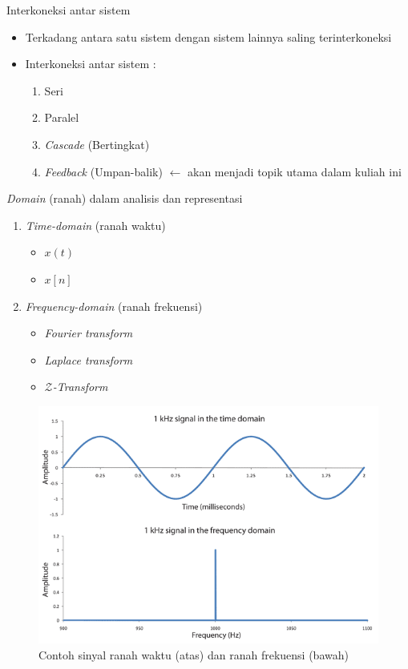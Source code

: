 \documentclass[aspectratio=169]{beamer}
\begin{document}
\begin{frame}{Interkoneksi antar sistem}
	\begin{itemize}
		\item Terkadang antara satu sistem dengan sistem lainnya saling terinterkoneksi
		\item Interkoneksi antar sistem :
		\begin{enumerate}
			\item Seri
			\item Paralel
			\item \textit{Cascade} (Bertingkat)
			\item \textit{Feedback} (Umpan-balik) $ \leftarrow $ akan menjadi topik utama dalam kuliah ini
		\end{enumerate}
	\end{itemize}
\end{frame}

\begin{frame}{\textit{Domain} (ranah) dalam analisis dan representasi}
	\begin{multicols}{2}
		\vfil\null
		\begin{enumerate}
			\item \textit{Time-domain} (ranah waktu)
			\begin{itemize}
				\item $ x(t) $
				\item $ x[n] $
			\end{itemize}
			\item \textit{Frequency-domain} (ranah frekuensi)
			\begin{itemize}
				\item \textit{Fourier transform}
				\item \textit{Laplace transform}
				\item \textit{$ \mathcal{Z} $-Transform}
			\end{itemize}
		\end{enumerate}
		\vfil\null
		\columnbreak
		\begin{figure}
			\centering
			\includegraphics[height=0.6\textheight]{gambar/00.pengantar/00.TimeDomain}
			\caption{Contoh sinyal ranah waktu (atas) dan ranah frekuensi (bawah)}
		\end{figure}
	\end{multicols}
\end{frame}
\end{document}
